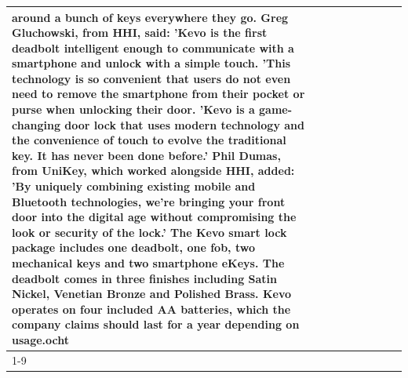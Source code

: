 \begin{table}[H]
\begin{tabular}{lllrlllll}
around a bunch of keys everywhere they go. Greg Gluchowski, from HHI, said: 'Kevo is the first deadbolt intelligent enough to communicate with a smartphone and unlock with a simple touch. 'This technology is so convenient that users do not even need to remove the smartphone from their pocket or purse when unlocking their door. 'Kevo is a game-changing door lock that uses modern technology and the convenience of touch to evolve the traditional key. It has never been done before.' Phil Dumas, from UniKey, which worked alongside HHI, added: 'By uniquely combining existing mobile and Bluetooth technologies, we’re bringing your front door into the digital age without compromising the look or security of the lock.' The Kevo smart lock package includes one deadbolt, one fob, two mechanical keys and two smartphone eKeys. The deadbolt comes in three finishes including Satin Nickel, Venetian Bronze and Polished Brass. Kevo operates on four included AA batteries, which the company claims should last for a year depending on usage.ocht \\
\cline{1-9}

\end{tabular}
\end{table}
